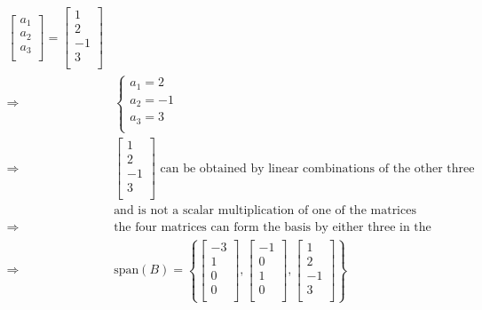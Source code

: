 \documentclass{article}
\begin{document}
\begin{equation*}
\begin{split}
\begin{bmatrix}
            a_1\\
            a_2\\
            a_3\\
        \end{bmatrix}=\begin{bmatrix}
            1\\
            2\\
            -1\\
            3\\
        \end{bmatrix}\\
        \Rightarrow&\begin{cases}
            a_1=2\\
            a_2=-1\\
            a_3=3\\
        \end{cases}\\
        \Rightarrow&\begin{bmatrix}
            1\\
            2\\
            -1\\
            3\\
        \end{bmatrix}\text{ can be obtained by linear combinations of the other three}\\
        &\text{and is not a scalar multiplication of one of the matrices}\\
        \Rightarrow&\text{the four matrices can form the basis by either three in the four}\\
        \Rightarrow&\text{span}(B)=\left\{\begin{bmatrix}
            -3\\
            1\\
            0\\
            0\\
        \end{bmatrix},\begin{bmatrix}
            -1\\
            0\\
            1\\
            0\\
        \end{bmatrix},\begin{bmatrix}
            1\\
            2\\
            -1\\
            3\\
        \end{bmatrix}\right\}\\
    \end{split}
\end{equation*}
\end{document}

